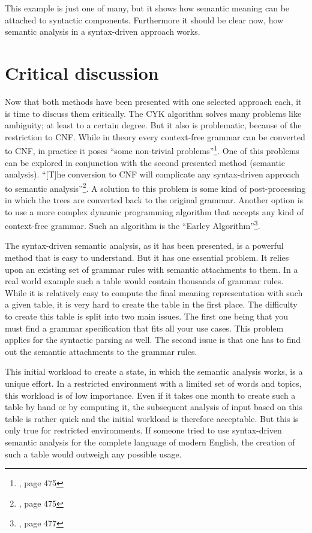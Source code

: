 \documentclass[12pt,twoside]{scrartcl}
\theoremstyle{plain}
\theoremstyle{definition}
\theoremstyle{remark}
\begin{document}
		This example is just one of many, but it shows how semantic meaning can be attached to syntactic components. Furthermore it should be clear now, how semantic analysis in a syntax-driven approach works.
\section{Critical discussion}
\label{sec:critDiscussion}

	Now that both methods have been presented with one selected approach each, it is time to discuss them critically. The CYK algorithm solves many problems like ambiguity; at least to a certain degree. But it also is problematic, because of the restriction to CNF. While in theory every context-free grammar can be converted to CNF, in practice it poses ``some non-trivial problems''\footnote{\cite{Jurafsky2009b}, page 475}. One of this problems can be explored in conjunction with the second presented method (semantic analysis). ``[T]he conversion to CNF will complicate any syntax-driven approach to semantic analysis''\footnote{\cite{Jurafsky2009b}, page 475}. A solution to this problem is some kind of post-processing in which the trees are converted back to the original grammar.\cite{Jurafsky2009b} Another option is to use a more complex dynamic programming algorithm that accepts any kind of context-free grammar. Such an algorithm is the ``Earley Algorithm''\footnote{\cite{Jurafsky2009b}, page 477}.
	
	The syntax-driven semantic analysis, as it has been presented, is a powerful method that is easy to understand. But it has one essential problem. It relies upon an existing set of grammar rules with semantic attachments to them. In a real world example such a table would contain thousands of grammar rules. While it is relatively easy to compute the final meaning representation with such a given table, it is very hard to create the table in the first place. The difficulty to create this table is split into two main issues. The first one being that you must find a grammar specification that fits all your use cases. This problem applies for the syntactic parsing as well. The second issue is that one has to find out the semantic attachments to the grammar rules.
	
	This initial workload to create a state, in which the semantic analysis works, is a unique effort. In a restricted environment with a limited set of words and topics, this workload is of low importance. Even if it takes one month to create such a table by hand or by computing it, the subsequent analysis of input based on this table is rather quick and the initial workload is therefore acceptable. But this is only true for restricted environments. If someone tried to use syntax-driven semantic analysis for the complete language of modern English, the creation of such a table would outweigh any possible usage.
	
\end{document}
